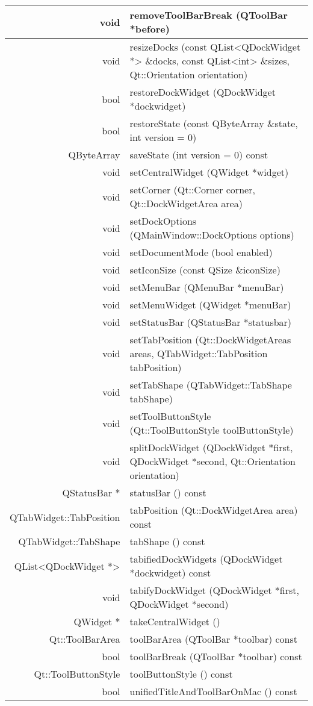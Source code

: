 \begin{longtable}[l]{|r|m{20em}|}
\hline
void 	&removeToolBarBreak (QToolBar *before) \\ 
\hline
void 	&resizeDocks (const QList<QDockWidget *> \&docks, const QList<int> \&sizes, Qt::Orientation orientation) \\ 
\hline
bool 	&restoreDockWidget (QDockWidget *dockwidget) \\ 
\hline
bool 	&restoreState (const QByteArray \&state, int version = 0) \\ 
\hline
QByteArray &	saveState (int version = 0) const \\ 
\hline
void &	setCentralWidget (QWidget *widget) \\ 
\hline
void &	setCorner (Qt::Corner corner, Qt::DockWidgetArea area) \\ 
\hline
void 	&setDockOptions (QMainWindow::DockOptions options) \\ 
\hline
void &	setDocumentMode (bool enabled) \\ 
\hline
void &	setIconSize (const QSize \&iconSize) \\ 
\hline
void &	setMenuBar (QMenuBar *menuBar) \\ 
\hline
void& 	setMenuWidget (QWidget *menuBar) \\ 
\hline
void &	setStatusBar (QStatusBar *statusbar) \\ 
\hline
void &	setTabPosition (Qt::DockWidgetAreas areas, QTabWidget::TabPosition tabPosition) \\ 
\hline
void &	setTabShape (QTabWidget::TabShape tabShape) \\ 
\hline
void 	&setToolButtonStyle (Qt::ToolButtonStyle toolButtonStyle) \\ 
\hline
void 	&splitDockWidget (QDockWidget *first, QDockWidget *second, Qt::Orientation orientation) \\ 
\hline
QStatusBar * & 	statusBar () const \\ 
\hline
QTabWidget::TabPosition &	tabPosition (Qt::DockWidgetArea area) const \\ 
\hline
QTabWidget::TabShape & 	tabShape () const \\
\hline
QList<QDockWidget *> 	&tabifiedDockWidgets (QDockWidget *dockwidget) const \\
\hline
void &	tabifyDockWidget (QDockWidget *first, QDockWidget *second) \\ 
\hline
QWidget *& 	takeCentralWidget () \\ 
\hline
Qt::ToolBarArea &	toolBarArea (QToolBar *toolbar) const \\ 
\hline
bool &	toolBarBreak (QToolBar *toolbar) const \\ 
\hline
Qt::ToolButtonStyle & 	toolButtonStyle () const \\ 
\hline
bool &	unifiedTitleAndToolBarOnMac () const \\
\hline
\end{longtable}

